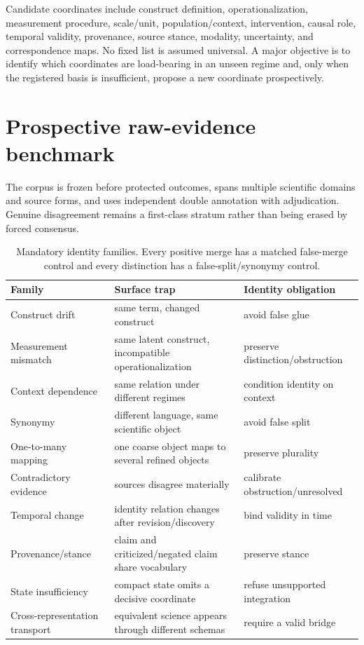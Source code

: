 \documentclass[11pt]{article}
\begin{document}
Candidate coordinates include construct definition, operationalization, measurement procedure, scale/unit, population/context, intervention, causal role, temporal validity, provenance, source stance, modality, uncertainty, and correspondence maps. No fixed list is assumed universal. A major objective is to identify which coordinates are load-bearing in an unseen regime and, only when the registered basis is insufficient, propose a new coordinate prospectively.

\section{Prospective raw-evidence benchmark}
The corpus is frozen before protected outcomes, spans multiple scientific domains and source forms, and uses independent double annotation with adjudication. Genuine disagreement remains a first-class stratum rather than being erased by forced consensus.

\begin{table}[h]
\centering
\small
\begin{tabularx}{\textwidth}{@{}lXX@{}}
\toprule
Family & Surface trap & Identity obligation \\
\midrule
Construct drift & same term, changed construct & avoid false glue \\
Measurement mismatch & same latent construct, incompatible operationalization & preserve distinction/obstruction \\
Context dependence & same relation under different regimes & condition identity on context \\
Synonymy & different language, same scientific object & avoid false split \\
One-to-many mapping & one coarse object maps to several refined objects & preserve plurality \\
Contradictory evidence & sources disagree materially & calibrate obstruction/unresolved \\
Temporal change & identity relation changes after revision/discovery & bind validity in time \\
Provenance/stance & claim and criticized/negated claim share vocabulary & preserve stance \\
State insufficiency & compact state omits a decisive coordinate & refuse unsupported integration \\
Cross-representation transport & equivalent science appears through different schemas & require a valid bridge \\
\bottomrule
\end{tabularx}
\caption{Mandatory identity families. Every positive merge has a matched false-merge control and every distinction has a false-split/synonymy control.}
\end{table}
\end{document}
